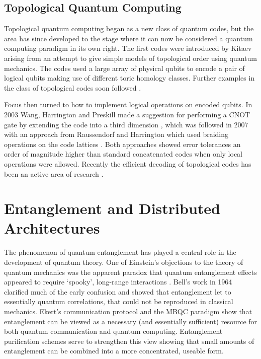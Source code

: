 \subsection{Topological Quantum Computing}

Topological quantum computing began as a new class of quantum codes, but the area has since developed to the stage where it can now be considered a quantum computing paradigm in its own right. The first codes were introduced by Kitaev \cite{kitaev_1, kitaev_2} arising from an attempt to give simple models of topological order using quantum mechanics. The codes used a large array of physical qubits to encode a pair of logical qubits making use of different toric homology classes. Further examples in the class of topological codes soon followed \cite{kitaev_bravyi, planar_codes_freedman_meyer}.

Focus then turned to how to implement logical operations on encoded qubits. In 2003 Wang, Harrington and Preskill made a suggestion for performing a CNOT gate by extending the code into a third dimension \cite{planar_cnot_preskill}, which was followed in 2007 with an approach from Raussendorf and Harrington which used braiding operations on the code lattices \cite{raussendorf07, raussendorf07_2}. Both approaches showed error tolerances an order of magnitude higher than standard concatenated codes when only local operations were allowed. Recently the efficient decoding of topological codes has been an active area of research \cite{fowler_matching_12, poulin_renormalisation, poulin_renormalisation2, wooton_mcmc1}.

\section{Entanglement and Distributed Architectures}

The phenomenon of quantum entanglement has played a central role in the development of quantum theory. One of Einstein's objections to the theory of quantum mechanics was the apparent paradox that quantum entanglement effects appeared to require `spooky', long-range interactions \cite{epr}. Bell's work in 1964 \cite{bells_theorem} clarified much of the early confusion and showed that entanglement let to essentially quantum correlations, that could not be reproduced in classical mechanics. Ekert's communication protocol \cite{ekert_91} and the MBQC paradigm \cite{one_way_qc} show that entanglement can be viewed as a necessary (and essentially sufficient) resource for both quantum communication and quantum computing. Entanglement purification schemes \cite{purification} serve to strengthen this view showing that small amounts of entanglement can be combined into a more concentrated, useable form.

